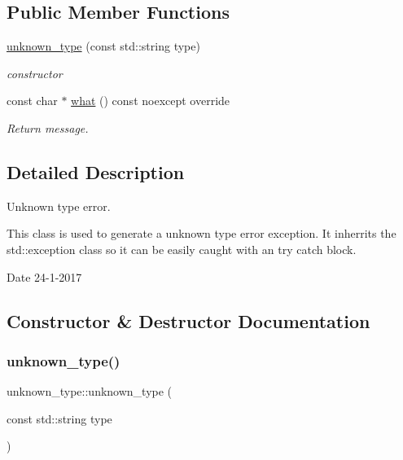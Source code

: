 \subsection*{Public Member Functions}
\begin{DoxyCompactItemize}
\item 
\hyperlink{classunknown__type_ad0900df174fd2897ea46896d46d4ce47}{unknown\+\_\+type} (const std\+::string type)
\begin{DoxyCompactList}\small\item\em constructor \end{DoxyCompactList}\item 
const char $\ast$ \hyperlink{classunknown__type_a95f8c551c7bf001353d4a68b6874650d}{what} () const noexcept override
\begin{DoxyCompactList}\small\item\em Return message. \end{DoxyCompactList}\end{DoxyCompactItemize}


\subsection{Detailed Description}
Unknown type error. 

This class is used to generate a unknown type error exception. It inherrits the std\+::exception class so it can be easily caught with an try catch block.

\begin{DoxyDate}{Date}
24-\/1-\/2017 
\end{DoxyDate}


\subsection{Constructor \& Destructor Documentation}
\mbox{\label{classunknown__type_ad0900df174fd2897ea46896d46d4ce47}} 
\subsubsection{\texorpdfstring{unknown\+\_\+type()}{unknown\_type()}}
{\footnotesize\ttfamily unknown\+\_\+type\+::unknown\+\_\+type (\begin{DoxyParamCaption}\item[{const std\+::string}]{type }\end{DoxyParamCaption})\hspace{0.3cm}{\ttfamily [inline]}}



